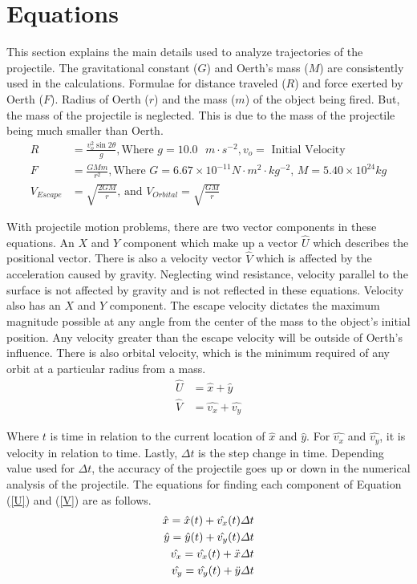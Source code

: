 \documentclass[12pt]{extarticle}
\begin{document}
\section{Equations}
This section explains the main details used to analyze trajectories of the projectile. The gravitational constant ($G$) and Oerth's mass ($M$) are consistently used in the calculations. Formulae for distance traveled ($R$) and force exerted by Oerth ($F$). Radius of Oerth ($r$) and the mass ($m$) of the object being fired. But, the mass of the projectile is neglected. This is due to the mass of the projectile being much smaller than Oerth.
\begin{align}
\label{R}
R &= \frac{v_o^{2}\sin{2\theta}}{g}, \text{Where } g = 10.0\text{ } m \cdot s^{-2}, v_o =  \text{ Initial Velocity} \\
\label{F}
F &= \frac{GMm}{r^{2}}, \text{Where } G = 6.67 \times 10^{-11}N\cdot m^{2}\cdot kg^{-2} \text{, \ \  } M = 5.40 \times 10^{24}kg \\
\label{Esc}
V_{Escape} &= \sqrt{\frac{2GM}{r}} \text{, and } V_{Orbital} = \sqrt{\frac{GM}{r}}
\end{align}



With projectile motion problems, there are two vector components in these equations. An $X$ and $Y$ component which make up a vector $\hat{U}$ which describes the positional vector. There is also a velocity vector $\hat{V}$ which is affected by the acceleration caused by gravity. Neglecting wind resistance, velocity parallel to the surface is not affected by gravity and is not reflected in these equations. Velocity also has an $X$ and $Y$ component. The escape velocity dictates the maximum magnitude possible at any angle from the center of the mass to the object's initial position. Any velocity greater than the escape velocity will be outside of Oerth's influence. There is also orbital velocity, which is the minimum required of any orbit at a particular radius from a mass.
\begin{align}
\label{U}
\hat{U} &= \hat{x} + \hat{y}\\
\label{V}
\hat{V} &= \hat{v_x} + \hat{v_y}
\end{align}

Where $t$ is time in relation to the current location of $\hat{x}$ and $\hat{y}$. For $\hat{v_x}$ and $\hat{v_y}$, it is velocity in relation to time. Lastly, $\varDelta{t}$ is the step change in time. Depending value used for $\varDelta t$, the accuracy of the projectile goes up or down in the numerical analysis of the projectile. The equations for finding each component of Equation (\ref{U}) and (\ref{V}) are as follows.
\begin{align}
\notag
\hat{x} = \hat{x}(t) + \hat{v_x}(t)\varDelta{t}\\
\notag
\hat{y} = \hat{y}(t) + \hat{v_y}(t)\varDelta{t}\\
\notag
\hat{v_x} = \hat{v_x}(t) + \ddot{x}\varDelta{t}\\
\notag
\hat{v_y} = \hat{v_y}(t) +\ddot{y}\varDelta{t}
\end{align}
\end{document}
